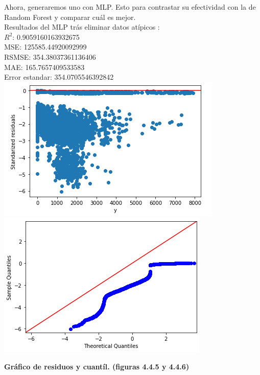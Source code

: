 \documentclass{article}
\begin{document}
        Ahora, generaremos uno con MLP. Esto para contrastar su efectividad con la de Random Forest y comparar cuál es mejor.\\
        
        Resultados del MLP trás eliminar datos atípicos
        :\\
                
                $R^2$:  0.9059160163932675\\
                MSE:  125585.44920092999\\
                RSMSE:  354.38037361136406\\
                MAE:  165.7657409533583\\
                Error estandar:  354.0705546392842\\
        
        
        
                \includegraphics[scale=0.6]{images/residuos-discharge-MLP-2.PNG} 
                \includegraphics[scale=0.6]{images/residuos-discharge-MLP-quantil.PNG} \\
                \begin{center}
                    \textbf{Gráfico de residuos y cuantíl. (figuras 4.4.5 y 4.4.6)}
                \end{center}
                
\end{document}
